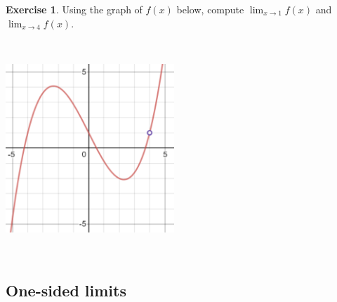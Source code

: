\documentclass[11pt,reqno,final]{amsart}
\numberwithin{equation}{section}
\numberwithin{figure}{section}
\theoremstyle{definition} %
\newtheorem{exercise}[question]{Exercise}
\begin{document}
\begin{exercise}
        Using the graph of $f(x)$ below, compute $\displaystyle\lim_{x \to 1} f(x)$ and $\displaystyle\lim_{x \to 4}f(x)$.

        $ $\\
        
        \begin{minipage}{.5\textwidth}
                \includegraphics[width=2.5in]{09-18P_hole.png}
        \end{minipage}
        \begin{minipage}{.5\textwidth}
                $ $
        \end{minipage}
\end{exercise}

\newpage

\subsection{One-sided limits}
\end{document}
